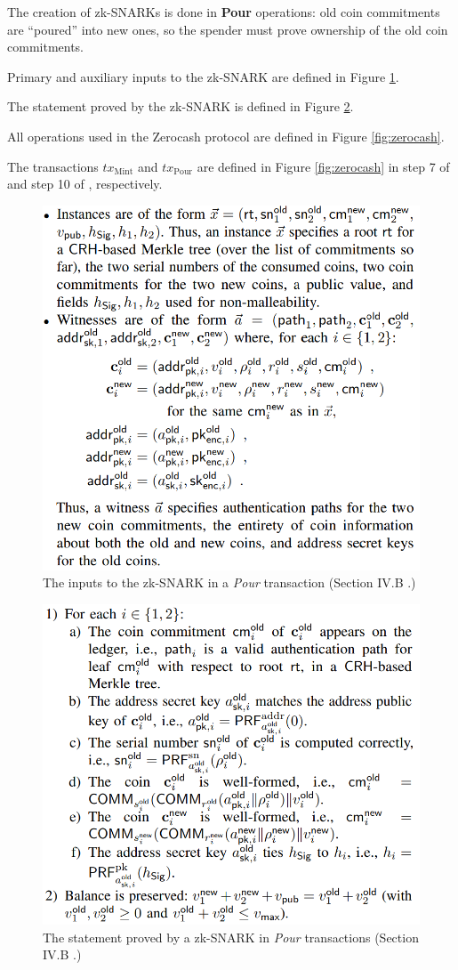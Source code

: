 \documentclass{article}
\begin{document}
The creation of zk-SNARKs is done in \textbf{Pour} operations:
old coin commitments are ``poured'' into new ones, so the spender must prove ownership of the old coin commitments.

Primary and auxiliary inputs to the zk-SNARK are defined in Figure \ref{fig:zerocash-inputs}.

The statement proved by the zk-SNARK is defined in Figure \ref{fig:zerocash-pour}.

All operations used in the Zerocash protocol are defined in Figure \ref{fig:zerocash}.

The transactions $tx_\text{Mint}$ and $tx_\text{Pour}$ are defined in Figure \ref{fig:zerocash} in step 7 of  and step 10 of , respectively.

\pagebreak

\begin{figure}[H]
\centering
\includegraphics[width=.6\textwidth]{zerocash-inputs.png}
\caption{The inputs to the zk-SNARK in a \textit{Pour} transaction (Section IV.B \cite{bensasson:zerocash}.)} \label{fig:zerocash-inputs}
\centering
\end{figure}

\begin{figure}[H]
\centering
\includegraphics[width=.6\textwidth]{zerocash-pour.png}
\caption{The statement proved by a zk-SNARK in \textit{Pour} transactions (Section IV.B \cite{bensasson:zerocash}.)} \label{fig:zerocash-pour}
\centering
\end{figure}
\end{document}
